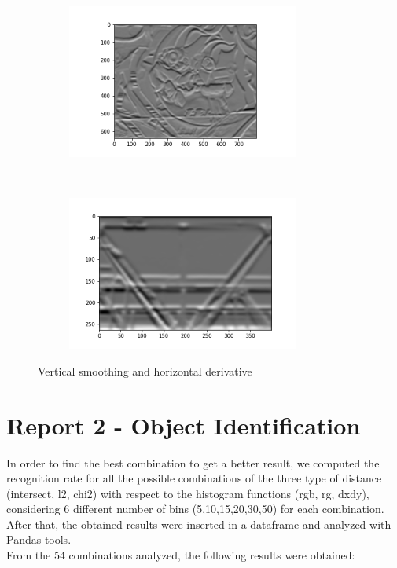\documentclass[
	12pt, %
]{fphw}
\begin{document}
\begin{figure}[h!]
    \centering
    \begin{subfigure}[t]{0.5\textwidth}
        \centering
        \includegraphics[height=2in]{img/1e/graf2.png}

    \end{subfigure}%
    ~ 
    \begin{subfigure}[t]{0.4\textwidth}
        \centering
        \includegraphics[height=2in]{img/1e/gantry2.png}

	\end{subfigure}
	\caption{Vertical smoothing and horizontal derivative}
\end{figure}






\newpage
\section*{Report 2 - Object Identification}


In order to find the best combination to get a better result, we computed the recognition rate for all the possible combinations of the three type of distance (intersect, l2, chi2) with respect to the histogram functions (rgb, rg, dxdy), considering 6 different number of bins (5,10,15,20,30,50) for each combination. After that, the obtained results were inserted in a dataframe and analyzed with Pandas tools. \\
From the 54 combinations analyzed, the following results were obtained:\\ \\
\end{document}
